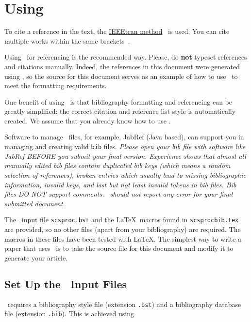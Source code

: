 \documentclass{scspaperproc}
\theoremstyle{scsthe}
\begin{document}
\section{Using \BibTeX}
\label{sec:bibtex}

To cite a reference in the text, the \href{https://www.bibtex.com/s/bibliography-style-ieeetran-ieeetran/}{IEEEtran method}~\cite{IEEEtran} is used. 
You can cite multiple works within the same brackets~\cite{IEEEtran, chi89, bcnn:simulation}.

Using \BibTeX\ for referencing is the recommended way. Please, do \textbf{not} typeset references and citations manually. Indeed, the references in this document were generated using \BibTeX, so the source for this document serves as an example of how to use \BibTeX\ to meet the formatting requirements.

One benefit of using \BibTeX\ is that bibliography formatting and referencing can be greatly simplified: the correct citation and reference list style is automatically created. We assume that you already know how to use \BibTeX.

Software to manage \BibTeX\ files, for example, JabRef (Java based), can support you in managing and creating valid \texttt{bib} files.
\emph{Please open your bib file with software like JabRef BEFORE you submit your final version. Experience shows that almost all manually edited bib files contain duplicated bib keys (which means a random selection of references), broken entries which usually lead to missing bibliographic information, invalid keys, and last but not least invalid tokens in bib files. Bib files DO NOT support comments. \BibTeX\ should not report any error for your final submitted document.}

The \BibTeX\ input file \texttt{scsproc.bst} and the \LaTeX\ macros found in \texttt{scsprocbib.tex} are provided, so no other files (apart from your bibliography) are required. The macros in these files have been tested with \LaTeX. The simplest way to write a paper that uses \BibTeX\ is to take the source file for this document and modify it to generate your article.

\subsection{Set Up the \BibTeX\ Input Files}

\BibTeX\ requires a bibliography style file (extension \texttt{.bst}) and a bibliography database file (extension \texttt{.bib}).  This is achieved using
\end{document}
